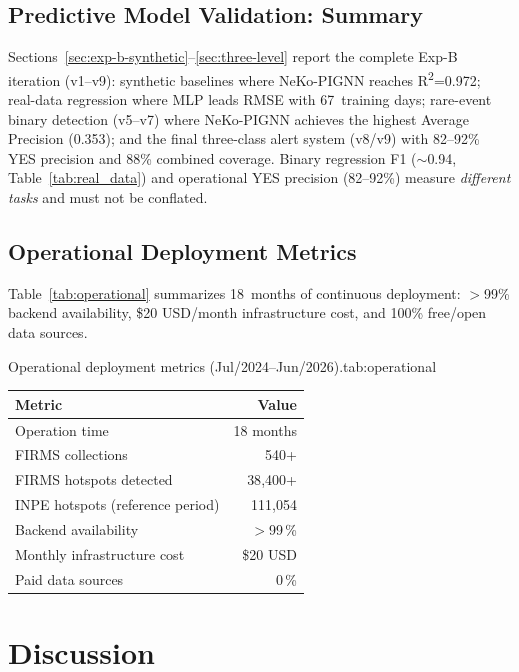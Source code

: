 \documentclass[preprint,12pt,times,numbers]{elsarticle}
\begin{document}
\subsection{Predictive Model Validation: Summary}
\label{sec:model_validation}

Sections~\ref{sec:exp-b-synthetic}--\ref{sec:three-level} report the complete Exp-B iteration (v1--v9): synthetic baselines where NeKo-PIGNN reaches R\textsuperscript{2}=0.972; real-data regression where MLP leads RMSE with 67~training days; rare-event binary detection (v5--v7) where NeKo-PIGNN achieves the highest Average Precision (0.353); and the final three-class alert system (v8/v9) with 82--92\% YES precision and 88\% combined coverage. Binary regression F1 ($\sim$0.94, Table~\ref{tab:real_data}) and operational YES precision (82--92\%) measure \emph{different tasks} and must not be conflated.

\subsection{Operational Deployment Metrics}
\label{sec:operational-perf}

Table~\ref{tab:operational} summarizes 18~months of continuous deployment: $>$99\% backend availability, \$20 USD/month infrastructure cost, and 100\% free/open data sources.

\begin{resulttable}{Operational deployment metrics (Jul/2024--Jun/2026).}{tab:operational}
\begin{tabular}{@{}lr@{}}
\toprule
\textbf{Metric} & \textbf{Value} \\
\midrule
Operation time & 18 months \\
FIRMS collections & 540+ \\
FIRMS hotspots detected & 38{,}400+ \\
INPE hotspots (reference period) & 111{,}054 \\
Backend availability & $>$99\,\% \\
Monthly infrastructure cost & \$20 USD \\
Paid data sources & 0\,\% \\
\bottomrule
\end{tabular}
\end{resulttable}

\section{Discussion}
\label{sec:discussion}
\end{document}
